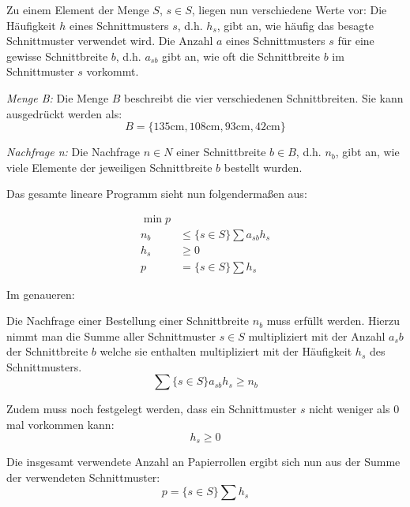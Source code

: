 Zu einem Element der Menge $S$, $s \in S$, liegen nun verschiedene Werte vor:
Die Häufigkeit $h$ eines Schnittmusters $s$, d.h. $h_s$, gibt an, wie häufig das besagte Schnittmuster verwendet wird.
Die Anzahl $a$ eines Schnittmusters $s$ für eine gewisse Schnittbreite $b$, d.h. $a_{sb}$ gibt an, wie oft die Schnittbreite $b$ im Schnittmuster $s$ vorkommt.

\emph{Menge B:} Die Menge $B$ beschreibt die vier verschiedenen Schnittbreiten. Sie kann ausgedrückt werden als: 
\[ B = \{135\text{cm},108\text{cm},93\text{cm},42\text{cm}\} \]

\emph{Nachfrage n:} Die Nachfrage $n \in N$ einer Schnittbreite $b \in B$, d.h. $n_b$, gibt an, wie viele Elemente der jeweiligen Schnittbreite $b$ bestellt wurden. 


Das gesamte lineare Programm sieht nun folgendermaßen aus:
 
\begin{align*}
\min p & \\
 n_b  & \leq \{s \in S\}\sum a_{sb} h_s\\
h_s & \geq 0 \\
p & = \{s \in S\}\sum h_s 
\end{align*}

Im genaueren:


Die Nachfrage einer Bestellung einer Schnittbreite $n_b$ muss erfüllt werden. Hierzu nimmt man die Summe aller Schnittmuster $s \in S$ multipliziert mit der Anzahl $a_sb$ der Schnittbreite $b$ welche sie enthalten multipliziert mit der Häufigkeit $h_s$ des Schnittmusters.
\[ \sum\{s \in S\}a_{sb} h_s \geq n_b \] 

Zudem muss noch festgelegt werden, dass ein Schnittmuster $s$ nicht weniger als 0 mal vorkommen kann:
\[ h_s \geq 0 \]

Die insgesamt verwendete Anzahl an Papierrollen ergibt sich nun aus der Summe der verwendeten Schnittmuster:
\[ p = \{s \in S\} \sum h_s \]

 
